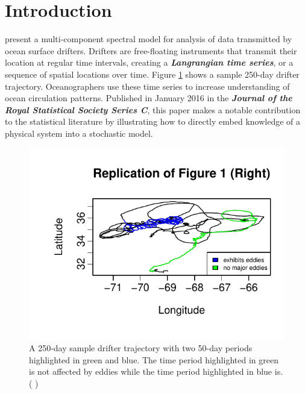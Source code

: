 \documentclass{stat572Style}
\newcommand{\vmcomment}[1]{({\color{blue}{VM's comment:}} \textbf{\color{blue}{#1}})}
\begin{document}
\section{Introduction}
\citet{Sykulski2016} present a multi-component spectral model for analysis of data transmitted by ocean surface drifters. 
Drifters are free-floating  instruments that transmit their location at regular time intervals,  creating a \textbf{\it{Langrangian time series}}, or a sequence of spatial locations over time. 
Figure \ref{fig: fig1} shows a sample 250-day drifter trajectory. 
Oceanographers use these time series to increase understanding of  ocean circulation patterns.
Published in January 2016 in the \textbf{\it{Journal of the Royal Statistical Society Series C}}, this paper makes a notable contribution to the statistical literature by illustrating how to directly embed knowledge of a physical system into a stochastic model. 
 \begin{figure}[h!]
  \centering
    \includegraphics[width=.6\textwidth]{ReplicatedFigures/fig1.pdf}
        \caption{A 250-day sample drifter trajectory with two 50-day periods highlighted in green and blue. The time period highlighted in green is not affected by eddies while the time period highlighted in blue is.
        \vmcomment{You could crop away the white space in the figure.}}
        	\label{fig: fig1}
\end{figure}
 
\end{document}
